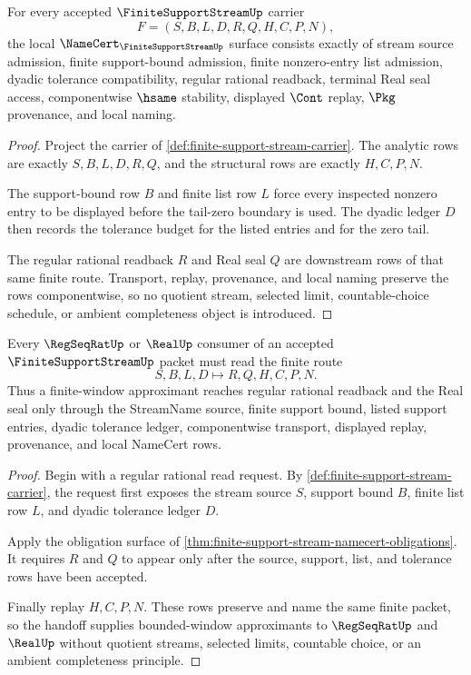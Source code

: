 \begin{theorem}
\label{thm:finite-support-stream-namecert-obligations}
For every accepted $\FiniteSupportStreamUp$ carrier
$$
F=(S,B,L,D,R,Q,H,C,P,N),
$$
the local $\NameCert_{\FiniteSupportStreamUp}$ surface consists exactly of stream source admission, finite support-bound admission, finite nonzero-entry list admission, dyadic tolerance compatibility, regular rational readback, terminal Real seal access, componentwise $\hsame$ stability, displayed $\Cont$ replay, $\Pkg$ provenance, and local naming.
\end{theorem}
\begin{proof}
Project the carrier of \autoref{def:finite-support-stream-carrier}. The analytic rows are exactly $S,B,L,D,R,Q$, and the structural rows are exactly $H,C,P,N$.

The support-bound row $B$ and finite list row $L$ force every inspected nonzero entry to be displayed before the tail-zero boundary is used. The dyadic ledger $D$ then records the tolerance budget for the listed entries and for the zero tail.

The regular rational readback $R$ and Real seal $Q$ are downstream rows of that same finite route. Transport, replay, provenance, and local naming preserve the rows componentwise, so no quotient stream, selected limit, countable-choice schedule, or ambient completeness object is introduced.
\end{proof}

\begin{theorem}
\label{thm:finite-support-stream-regseqrat-handoff}
Every $\RegSeqRatUp$ or $\RealUp$ consumer of an accepted $\FiniteSupportStreamUp$ packet must read the finite route
$$
S,B,L,D \longmapsto R,Q,H,C,P,N .
$$
Thus a finite-window approximant reaches regular rational readback and the Real seal only through the StreamName source, finite support bound, listed support entries, dyadic tolerance ledger, componentwise transport, displayed replay, provenance, and local NameCert rows.
\end{theorem}
\begin{proof}
Begin with a regular rational read request. By \autoref{def:finite-support-stream-carrier}, the request first exposes the stream source $S$, support bound $B$, finite list row $L$, and dyadic tolerance ledger $D$.

Apply the obligation surface of \autoref{thm:finite-support-stream-namecert-obligations}. It requires $R$ and $Q$ to appear only after the source, support, list, and tolerance rows have been accepted.

Finally replay $H,C,P,N$. These rows preserve and name the same finite packet, so the handoff supplies bounded-window approximants to $\RegSeqRatUp$ and $\RealUp$ without quotient streams, selected limits, countable choice, or an ambient completeness principle.
\end{proof}

